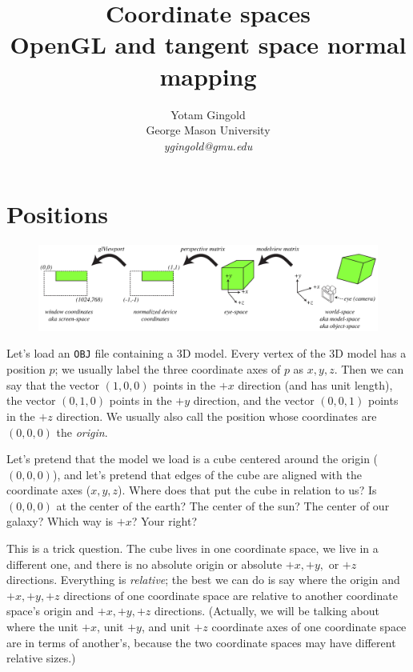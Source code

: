 \documentclass{article}
\title{Coordinate spaces\\\large{OpenGL and tangent space normal mapping}}
\author{Yotam Gingold\\
George Mason University\\
\emph{ygingold@gmu.edu}}
\date{}
\begin{document}
\maketitle


\section{Positions}
\begin{figure}
\centering
\includegraphics[width=\textwidth]{figures/positions}
\end{figure}

Let's load an \verb|OBJ| file containing a 3D model.
Every vertex of the 3D model has a position $p$; we usually
label the three coordinate axes of $p$ as $x,y,z$.  Then we can say that
the vector $(1,0,0)$ points in the $+x$ direction (and has unit length),
the vector $(0,1,0)$ points in the $+y$ direction, and
the vector $(0,0,1)$ points in the $+z$ direction.
We usually also call the position whose coordinates are $(0,0,0)$ the \emph{origin}.

Let's pretend that the model we load is a cube centered around the origin ($(0,0,0)$),
and let's pretend that edges of the cube are aligned with the coordinate axes ($x,y,z$).
Where does that put the cube in relation to us?  Is $(0,0,0)$ at the center of the earth?
The center of the sun?  The center of our galaxy?  Which way is $+x$?
Your right?

This is a trick question.  The cube lives in one coordinate space,
we live in a different one, and there is no absolute origin or
absolute $+x, +y,$ or $+z$ directions.
Everything is \emph{relative}; the best we can do is say
where the origin and $+x, +y, +z$ directions of one coordinate space are
relative to another coordinate space's origin and $+x,+y,+z$ directions.
(Actually, we will be talking about where the unit $+x$, unit $+y$, and unit $+z$
coordinate axes of one coordinate space are in terms of another's, because
the two coordinate spaces may have different relative sizes.)
\end{document}
